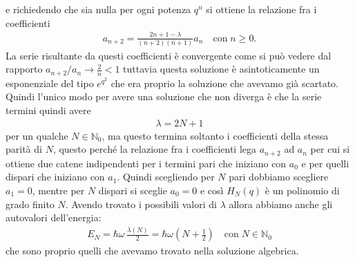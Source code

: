 e richiedendo che sia nulla per ogni potenza $ q^n $ si ottiene la relazione fra i coefficienti 
\begin{align} \label{eq: ricorsiva per coefficienti dei polinomi di Hermite}
  a_{n+2} = \frac{2n + 1 - \lambda}{(n+2) (n+1)} a_n \quad \text{con} \; n \geq 0.
\end{align}
La serie risultante da questi coefficienti è convergente come si può vedere dal rapporto $ a_{n+2}/a_{n} \to \frac2n < 1 $ tuttavia questa soluzione è 
asintoticamente un esponenziale del tipo $ e^{q^2} $ che era proprio la soluzione che avevamo già scartato. Quindi l'unico modo per avere una soluzione 
che non diverga è che la serie termini quindi avere 
\begin{align*}
  \lambda = 2N + 1
\end{align*}
per un qualche $ N \in \mathbb{N}_0 $, ma questo termina soltanto i coefficienti della stessa parità di $ N $, questo perché la relazione fra 
i coefficienti lega $ a_{n+2} $ ad $ a_n $ per cui si ottiene due catene indipendenti per i termini pari che iniziano con $ a_0 $ e per quelli 
dispari che iniziano con $ a_1 $. Quindi scegliendo per $ N $ pari dobbiamo scegliere $ a_1 = 0 $, mentre per $ N $ dispari si sceglie $ a_0 = 0 $ e 
così $ H_N(q) $ è un polinomio di grado finito $ N $. Avendo trovato i possibili valori di $ \lambda $ allora abbiamo anche gli autovalori dell'energia:
\begin{align*}
  E_N = \hbar\omega \,\frac{\lambda(N)}2 = \hbar \omega \left( N + \frac12 \right) \quad \text{con} \; N \in \mathbb{N}_0
\end{align*}
che sono proprio quelli che avevamo trovato nella soluzione algebrica.

